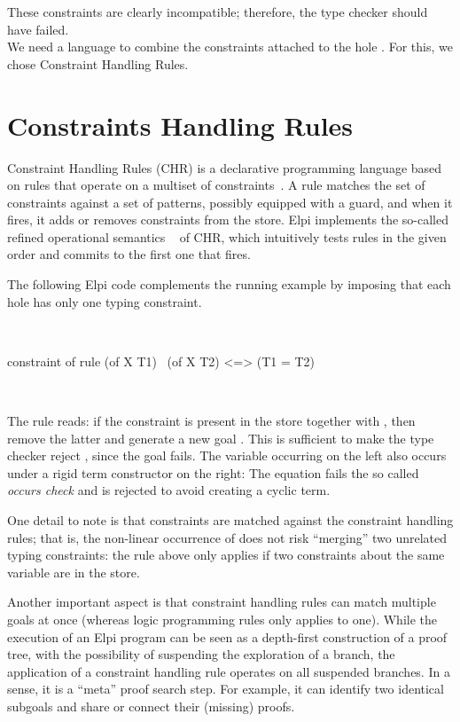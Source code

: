 \documentclass[a4paper, 11pt]{book}
\newenvironment{elpicode}
  {\VerbatimEnvironment~\\\begin{elpibox}\begin{xelpicode}}{\end{xelpicode}
\end{elpibox}\\}
\begin{document}
These constraints are clearly incompatible; therefore, the type checker
should have failed.
~\\

We need a language to combine the constraints attached to the hole
. For this, we chose Constraint Handling Rules.

\section{Constraints Handling Rules}\label{sec:chrui}


Constraint Handling Rules (CHR) is a declarative programming language based
on rules that operate on a multiset of constraints~\cite{chr}. A rule matches
the set of constraints against a set of patterns, possibly equipped with a
guard, and when it fires, it adds or removes constraints from the store.
Elpi implements the so-called refined operational semantics
~\cite{10.1007/978-3-540-27775-0_7} of CHR, which intuitively tests rules in
the given order and commits to the first one that fires.

The following Elpi code complements the running example by imposing that each
hole has only one typing constraint.

\begin{elpicode}
constraint of {
  rule (of X T1) \ (of X T2) <=> (T1 = T2)
}
\end{elpicode}


The rule reads: if the constraint  is present in the store
together with , then remove the latter and generate a new goal
. This is sufficient to make the type checker reject
, since the goal  fails.
The variable  occurring on the left also
occurs under a rigid term constructor  on the right:
The equation fails the so called \emph{occurs check} and is rejected
to avoid creating a cyclic term.

One detail to note is that constraints are matched against the constraint
handling rules; that is, the non-linear occurrence of  does not risk
``merging'' two unrelated typing constraints: the rule above only applies if two
constraints about the same variable are in the store.

Another important aspect is that constraint handling rules can match multiple
goals at once (whereas logic programming rules only applies to one). While
the execution of an Elpi program can be seen as a depth-first construction of
a proof tree, with the possibility of suspending the exploration of a branch,
the application of a constraint handling rule operates on all suspended
branches. In a sense, it is a ``meta'' proof search step. For example, it can
identify two identical subgoals and share or connect their (missing) proofs.
\end{document}
